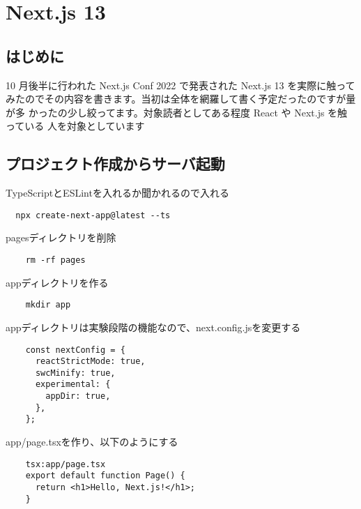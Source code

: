 \chapter{Next.js 13}
\section{はじめに}
10 月後半に行われた Next.js Conf 2022 で発表された Next.js 13 を実際に触って
みたのでその内容を書きます。当初は全体を網羅して書く予定だったのですが量が多
かったの少し絞ってます。対象読者としてある程度 React や Next.js を触っている
人を対象としています


\section{プロジェクト作成からサーバ起動}

TypeScriptとESLintを入れるか聞かれるので入れる
\begin{shaded}
  \begin{verbatim}
  npx create-next-app@latest --ts
\end{verbatim}
\end{shaded}



pagesディレクトリを削除
\begin{shaded}
  \begin{verbatim}
    rm -rf pages
  \end{verbatim}
\end{shaded}

appディレクトリを作る
\begin{shaded}
  \begin{verbatim}
    mkdir app
  \end{verbatim}
\end{shaded}


appディレクトリは実験段階の機能なので、next.config.jsを変更する


\begin{tcolorbox}[breakable]
  \begin{verbatim}
    const nextConfig = {
      reactStrictMode: true,
      swcMinify: true,
      experimental: {
        appDir: true,
      },
    };
  \end{verbatim}
\end{tcolorbox}



app/page.tsxを作り、以下のようにする

\begin{tcolorbox}[breakable]
  \begin{verbatim}
    tsx:app/page.tsx
    export default function Page() {
      return <h1>Hello, Next.js!</h1>;
    }
    
  \end{verbatim}
\end{tcolorbox}




